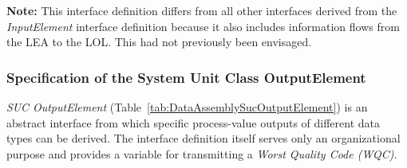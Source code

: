 \textbf{Note:} This interface definition differs from all other interfaces derived from the \emph{InputElement} interface definition because it also includes information flows from the LEA to the LOL. This had not previously been envisaged.

\subsubsection{Specification of the System Unit Class OutputElement}

\emph{SUC OutputElement} (Table~\ref{tab:DataAssemblySucOutputElement}) is an abstract interface from which specific process-value outputs of different data types can be derived. The interface definition itself serves only an organizational purpose and provides a variable for transmitting a \emph{Worst Quality Code (WQC)}.

